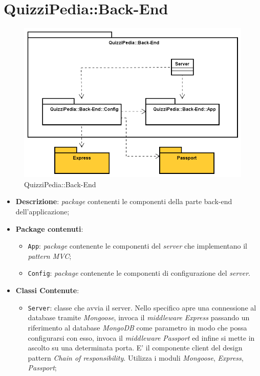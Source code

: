 \newpage
\section{QuizziPedia::Back-End}
\label{QuizziPedia::Back-End}
\begin{figure}[ht]
	\centering
	\includegraphics[scale=0.55]{UML/Package/QuizziPedia_Back-end.png}
	\caption{QuizziPedia::Back-End}
\end{figure}
\FloatBarrier
\begin{itemize}
	\item \textbf{Descrizione}:
	\textit{package} contenenti le componenti della parte back-end dell'applicazione;
	\item \textbf{Package contenuti}:
	\begin{itemize}
		\item \texttt{App}:
		\textit{package} contenente le componenti del \textit{server} che implementano il \textit{pattern MVC};
		\item \texttt{Config}:
		\textit{package} contenente le componenti di configurazione del \textit{server}.
	\end{itemize}
	\item \textbf{Classi Contenute}:
	\begin{itemize}
		\item \texttt{Server}: classe che avvia il server. Nello specifico apre una connessione al database tramite \textit{Mongoose}, invoca il \textit{middleware} \textit{Express} passando un riferimento al database \textit{MongoDB} come parametro in modo che possa configurarsi con esso, invoca il \textit{middleware} \textit{Passport} ed infine si mette in ascolto su una determinata porta. E' il componente client del design pattern \textit{Chain of responsibility}. Utilizza i moduli \textit{Mongoose}, \textit{Express}, \textit{Passport};
	\end{itemize}
\end{itemize}





	

